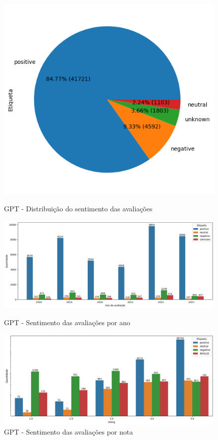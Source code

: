\begin{figure}
	\centering
	\begin{minipage}{0.8\textwidth}
		\centering
		\includegraphics[width=.6\textwidth]{figs/gpt/distribuicao_pizza.png}
		\caption{GPT - Distribuição do sentimento das avaliações}
		\label{img:gpt_pizza_distribuicao}
	\end{minipage}\hfill
	\begin{minipage}{1\textwidth}
		\centering
		\includegraphics[width=1\textwidth]{figs/gpt/sentimento_ano.png}
		\caption{GPT - Sentimento das avaliações por ano}
		\label{img:gpt_sentimento_ano}
	\end{minipage}\hfill
	\begin{minipage}{1\textwidth}
		\centering
		\includegraphics[width=1\textwidth]{figs/gpt/sentimento_nota.png}
		\caption{GPT - Sentimento das avaliações por nota}
		\label{img:gpt_sentimento_nota}
	\end{minipage}
\end{figure}


